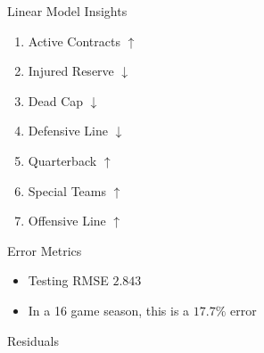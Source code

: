 \documentclass[11pt]{beamer}
\begin{document}
\begin{frame}{Linear Model Insights}

\begin{enumerate}

\item Active Contracts $\uparrow$

\item Injured Reserve $\downarrow$

\item Dead Cap $\downarrow$

\item Defensive Line $\downarrow$

\item Quarterback $\uparrow$

\item Special Teams $\uparrow$

\item Offensive Line $\uparrow$

\end{enumerate}

\end{frame}

\begin{frame}{Error Metrics}

\begin{itemize}


\item Testing RMSE $2.843$

\item In a 16 game season, this is a $17.7\%$ error

\end{itemize}

\end{frame}

\begin{frame}{Residuals}

\begin{figure}



\end{figure}


\end{frame}
\end{document}
